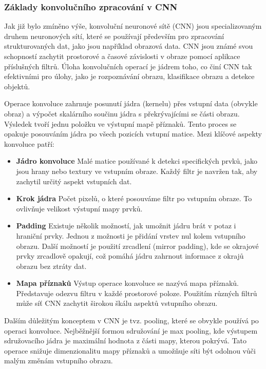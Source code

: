 \documentclass[male,czech,api_ing]{thesis}
\begin{document}
\subsubsection{Základy konvolučního zpracování v CNN}
Jak již bylo zmíněno výše, konvoluční neuronové sítě (CNN) jsou specializovaným druhem neuronových sítí, které se používají především pro zpracování strukturovaných dat, jako jsou například obrazová data. CNN jsou známé svou schopností zachytit prostorové a časové závislosti v obraze pomocí aplikace příslušných filtrů. Úloha konvolučních operací je jádrem toho, co činí CNN tak efektivními pro úlohy, jako je rozpoznávání obrazu, klasifikace obrazu a detekce objektů.

Operace konvoluce zahrnuje posunutí jádra (kernelu) přes vstupní data (obvykle obraz) a výpočet skalárního součinu jádra s překrývajícími se části obrazu. Výsledek tvoří jednu položku ve výstupní mapě příznaků. Tento proces se opakuje posouváním jádra po všech pozicích vstupní matice. Mezi klíčové aspekty konvoluce patří:

\begin{itemize}
    \item \textbf{Jádro konvoluce} Malé matice používané k detekci specifických prvků, jako jsou hrany nebo textury ve vstupním obraze. Každý filtr je navržen tak, aby zachytil určitý aspekt vstupních dat.
    \item \textbf{Krok jádra} Počet pixelů, o které posouváme filtr po vstupním obraze. To ovlivňuje velikost výstupní mapy prvků.
    \item \textbf{Padding} Existuje několik možností, jak umožnit jádru brát v potaz i hraniční prvky. Jednou z možnosti je přidání vrstev nul kolem vstupního obrazu. Další možností je použití zrcadlení (mirror padding), kde se okrajové prvky zrcadlově opakují, což pomáhá jádru zahrnout informace z okrajů obrazu bez ztráty dat.
    \item \textbf{Mapa příznaků} Výstup operace konvoluce se nazývá mapa příznaků. Představuje odezvu filtru v každé prostorové poloze. Použitím různých filtrů může síť CNN zachytit širokou škálu aspektů vstupního obrazu.
\end{itemize}

Dalším důležitým konceptem v CNN je tvz. pooling, které se obvykle používá po operaci konvoluce. Nejběžnější formou sdružování je max pooling, kde výstupem sdružovacího jádra je maximální hodnota z části mapy, kterou pokrývá. Tato operace snižuje dimenzionalitu mapy příznaků a umožňuje síti být odolnou vůči malým změnám vstupního obrazu.
\end{document}
